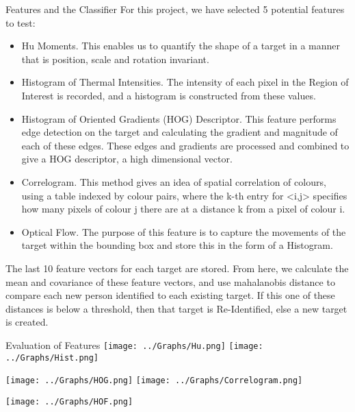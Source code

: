 \documentclass[final]{beamer}
\begin{document}
\begin{frame}{}
\begin{columns}[t]
      \begin{column}{.48\linewidth}
        \begin{block}{Features and the Classifier}
        For this project, we have selected 5 potential features to test:
          \begin{itemize}
          \item Hu Moments. 
          This enables us to quantify the shape of a target in a manner that is position, scale and rotation invariant.
          \item Histogram of Thermal Intensities. 
          The intensity of each pixel in the Region of Interest is recorded, and a histogram is constructed from these values.
          \item Histogram of Oriented Gradients (HOG) Descriptor. 
          This feature performs edge detection on the target and calculating the gradient and magnitude of each of these edges. These edges and gradients are processed and combined to give a HOG descriptor, a high dimensional vector. 
          \item Correlogram. 
           This method gives an idea of spatial correlation of colours, using a table indexed by colour pairs, where the k-th entry for <i,j> specifies how many pixels of colour j there are at a distance k from a pixel of colour i.
          \item Optical Flow. 
          The purpose of this feature is to capture the movements of the target within the bounding box and store this in the form of a Histogram.
          \end{itemize}
          The last 10 feature vectors for each target are stored. From here, we calculate the mean and covariance of these feature vectors, and use mahalanobis distance to compare each new person identified to each existing target. If this one of these distances is below a threshold, then that target is Re-Identified, else a new target is created.
        \end{block}

        \begin{block}{Evaluation of Features}
		\texttt{[image: ../Graphs/Hu.png]}
		\texttt{[image: ../Graphs/Hist.png]}
		
		\texttt{[image: ../Graphs/HOG.png]}
		\texttt{[image: ../Graphs/Correlogram.png]}
		
		\texttt{[image: ../Graphs/HOF.png]}
		

\end{block}
\end{column}
\end{columns}
\end{frame}
\end{document}
